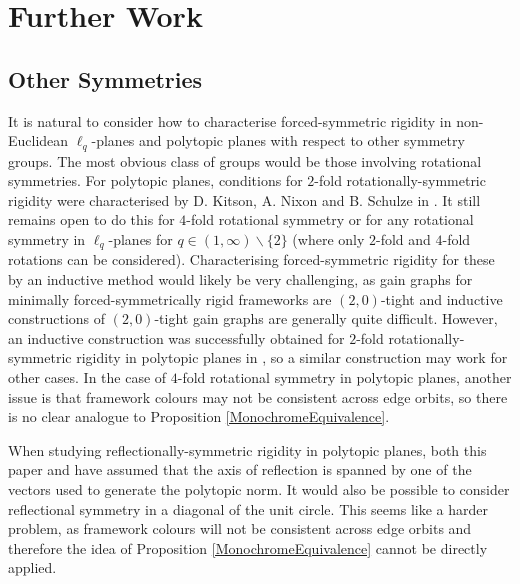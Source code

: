 \documentclass[reqno,a4paper,10pt]{article}
\theoremstyle{definition}
\theoremstyle{remark}
\numberwithin{equation}{section}
\numberwithin{figure}{section}
\numberwithin{table}{section}
\begin{document}
    \section{Further Work}\label{SectionFurther}
    \subsection{Other Symmetries}\label{SubsectionOtherSymmetries}
    It is natural to consider how to characterise forced-symmetric rigidity in non-Euclidean $\ell_q$-planes and polytopic planes with respect to other symmetry groups. The most obvious class of groups would be those involving rotational symmetries. For polytopic planes, conditions for $2$-fold rotationally-symmetric rigidity were characterised by D. Kitson, A. Nixon and B. Schulze in \cite[Theorem 4.3]{KitsonSymmetricNormed}. It still remains open to do this for $4$-fold rotational symmetry or for any rotational symmetry in $\ell_q$-planes for $q\in(1,\infty)\backslash\{2\}$ (where only $2$-fold and $4$-fold rotations can be considered). Characterising forced-symmetric rigidity for these by an inductive method would likely be very challenging, as gain graphs for minimally forced-symmetrically rigid frameworks are $(2,0)$-tight and inductive constructions of $(2,0)$-tight gain graphs are generally quite difficult. However, an inductive construction was successfully obtained for $2$-fold rotationally-symmetric rigidity in polytopic planes in \cite[Theorem 4.3]{KitsonSymmetricNormed}, so a similar construction may work for other cases. In the case of $4$-fold rotational symmetry in polytopic planes, another issue is that framework colours may not be consistent across edge orbits, so there is no clear analogue to Proposition \ref{MonochromeEquivalence}.

    When studying reflectionally-symmetric rigidity in polytopic planes, both this paper and \cite{GridLike} have assumed that the axis of reflection is spanned by one of the vectors used to generate the polytopic norm. It would also be possible to consider reflectional symmetry in a diagonal of the unit circle. This seems like a harder problem, as framework colours will not be consistent across edge orbits and therefore the idea of Proposition \ref{MonochromeEquivalence} cannot be directly applied.
\end{document}
